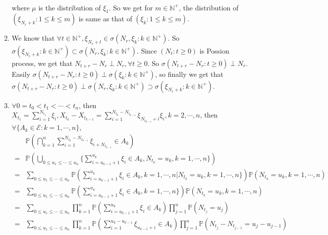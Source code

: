 \documentclass{ctexart}
\begin{document}
\begin{solution}
\begin{enumerate}
\begin{equation}
\begin{aligned}
        \end{aligned}
      \end{equation}
      where \(\mu\) is the distribution of \(\xi_1\).
      So we get for \(m \in \mathbb{N}^+\), the distribution of \((\xi_{N_r+k}:1 \leq k \leq m)\) is same as that of \((\xi_k:1 \leq k \leq m)\).
    \item
      We know that \(\forall t \in \mathbb{N}^+,\xi_{N_r + t} \in \sigma(N_r,\xi_k:k \in \mathbb{N}^+)\).
      So \(\sigma(\xi_{N_r + k}:k \in \mathbb{N}^+) \subset \sigma(N_r,\xi_k:k \in \mathbb{N}^+)\).
      Since \((N_t:t \geq 0)\) is Possion process, we get that \(N_{t + r}-N_r \perp N_r,\forall t \geq 0\).
      So \(\sigma(N_{t + r}-N_r:t \geq 0)\perp N_r\).
      Easily \(\sigma(N_{t + r}-N_r:t \geq 0)\perp \sigma(\xi_k:k \in \mathbb{N}^+)\), so finally we get that
      \(\sigma(N_{t + r}-N_r:t \geq 0)\perp \sigma(N_r,\xi_k:k \in \mathbb{N}^+)\supset \sigma(\xi_{N_r+k}:k \in \mathbb{N}^+)\).
    \item \(\forall 0 = t_0<t_1<\cdots<t_n\), then \(X_{t_1}=\sum_{i =1}^{N_{t_1}}\xi_i,X_{t_k}-X_{t_{k-1}}=\sum_{i=1}^{N_{t_k}-N_{t_{k-1}}}\xi_{N_{t_{k-1}} + i}\xi_i,k=2,\cdots,n\),
      then \(\forall\{A_k \in \mathscr{E}:k=1,\cdots,n\}\),
      \begin{equation}
        \begin{aligned}
            & \mathbb{P}(\bigcap_{k =1}^n \sum_{i=1}^{N_{t_k}-N_{t_{k-1}}}\xi_{i + N_{t_{k-1}}} \in A_k)                                                                                              \\
          = & \mathbb{P}(\bigcup_{0 \leq u_1\leq \cdots\leq u_n}\{\sum_{i=u_{k-1}+1}^{u_k}\xi_{i} \in A_k,N_{t_k}=u_k,k=1,\cdots,n\})                                                                 \\
          = & \sum_{0 \leq u_1\leq \cdots\leq u_n}\mathbb{P}(\sum_{i=u_{k-1} + 1}^{u_k}\xi_i  \in A_k, k=1,\cdots,n| N_{t_k}=u_k,k=1,\cdots,n\})\mathbb{P}(N_{t_{k}}=u_k,k=1,\cdots,n)                \\
          = & \sum_{0 \leq u_1\leq \cdots\leq u_n}\mathbb{P}(\sum_{i=u_{k-1} + 1}^{u_k}\xi_i  \in A_k, k=1,\cdots,n\})\mathbb{P}(N_{t_{k}}=u_k,k=1,\cdots,n)                                          \\
          = & \sum_{0 \leq u_1\leq \cdots\leq u_n}\prod_{k=1}^{n} \mathbb{P}(\sum_{i=u_{k-1} + 1}^{u_k}\xi_i  \in A_k)\prod_{j=1}^{n} \mathbb{P}(N_{t_{j}}=u_j)                                       \\
          = & \sum_{0 \leq u_1\leq \cdots\leq u_n}\prod_{k=1}^{n} \mathbb{P}(\sum_{i= 1}^{u_k-u_{k-1}}\xi_{u_{k-1}+ i}  \in A_k)\prod_{j=1}^{n} \mathbb{P}(N_{t_{j}}-N_{t_{j-1}}=u_j-u_{j-1})         \\

\end{aligned}
\end{equation}
\end{enumerate}
\end{solution}
\end{document}
